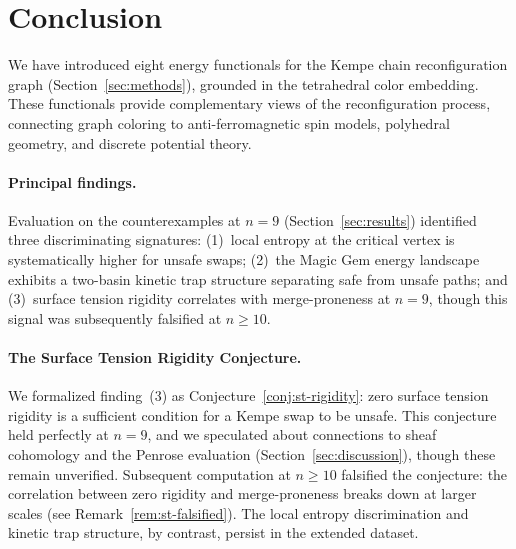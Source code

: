 
\section{Conclusion}\label{sec:conclusion}

We have introduced eight energy functionals for the Kempe chain
reconfiguration graph (Section~\ref{sec:methods}), grounded in the
tetrahedral color embedding. These functionals provide complementary
views of the reconfiguration process, connecting graph coloring to
anti-ferromagnetic spin models, polyhedral geometry, and discrete
potential theory.

\paragraph{Principal findings.}
Evaluation on the counterexamples at $n = 9$
(Section~\ref{sec:results}) identified three discriminating signatures:
(1)~local entropy at the critical vertex is systematically higher for
unsafe swaps; (2)~the Magic Gem energy landscape exhibits a two-basin
kinetic trap structure separating safe from unsafe paths; and
(3)~surface tension rigidity correlates with merge-proneness at $n = 9$,
though this signal was subsequently falsified at $n \geq 10$.

\paragraph{The Surface Tension Rigidity Conjecture.}
We formalized finding~(3) as
Conjecture~\ref{conj:st-rigidity}: zero surface tension rigidity is
a sufficient condition for a Kempe swap to be unsafe. This conjecture
held perfectly at $n = 9$, and we speculated about connections to sheaf
cohomology and the Penrose evaluation
(Section~\ref{sec:discussion}), though these remain unverified.
Subsequent computation at $n \geq 10$ falsified the conjecture: the
correlation between zero rigidity and merge-proneness breaks down at
larger scales (see Remark~\ref{rem:st-falsified}). The local entropy
discrimination and kinetic trap structure, by contrast, persist in the
extended dataset.

